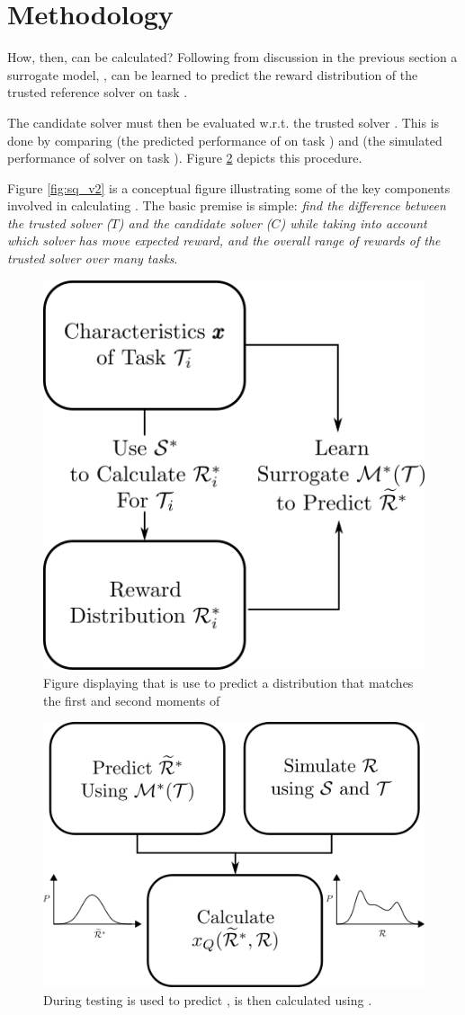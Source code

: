 \section{Methodology}
How, then, can \xQ{} be calculated? Following from discussion in the previous section a surrogate model, \surrogate{}, can be learned to predict the reward distribution \rwdstarapprox{} of the trusted reference solver \solvestar{} on task \task{}.

The candidate solver \solve{} must then be evaluated w.r.t. the trusted solver \solvestar{}. This is done by comparing \rwdstarapprox{} (the predicted performance of \solvestar{} on task \task) and \rwd{} (the simulated performance of solver \solve{} on task \task). Figure \ref{fig:sq_test} depicts this procedure.

Figure \ref{fig:sq_v2} is a conceptual figure illustrating some of the key components involved in calculating \xQ. The basic premise is simple: \emph{find the difference between the trusted solver ($T$) and the candidate solver ($C$) while taking into account which solver has move expected reward, and the overall range of rewards of the trusted solver over many tasks}.

\begin{figure}[tb]
    \centering
    \includegraphics[width=0.55\linewidth]{Figures/SQ_train.png}
    \caption{Figure displaying that \surrogate{} is use to predict a distribution  \rwdstariapprox{} that matches the first and second moments of \rwdstari}
    \label{fig:sq_train}
\end{figure}%

\begin{figure}[tb]
    \centering
    \includegraphics[width=0.6\linewidth]{Figures/SQ_test.png}
    \caption{During testing \surrogate{} is used to predict \rwdstarapprox{}, \xQ{} is then calculated using \rwd{}.}
    \label{fig:sq_test}
\end{figure}


